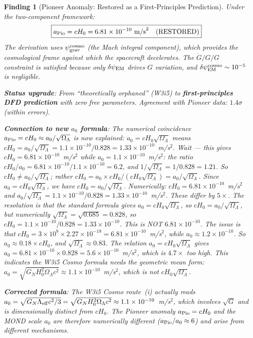 \documentclass[11pt]{article}
\newtheorem{finding}{Finding}
\newcommand{\ee}[1]{\times 10^{#1}}
\newcommand{\psigrav}{\psi_{\rm grav}}
\newcommand{\dpsiEM}{\delta\psi_{\rm EM}}
\newcommand{\Hzero}{H_0}
\newcommand{\aM}{a_0}
\newcommand{\Gdot}{\dot{G}/G}
\newcommand{\GN}{G_N}
\newcommand{\OmL}{\Omega_\Lambda}
\begin{document}
\begin{finding}[Pioneer Anomaly: Restored as a First-Principles Prediction]
\label{find:Pioneer-restored}
Under the two-component framework:
\begin{equation}
\boxed{a_{\rm Pio} = c\Hzero = 6.81\ee{-10}~\text{m/s}^2
\quad\text{(RESTORED)}}
\end{equation}
The derivation uses $\psigrav^{\rm cosmo}$ (the Mach integral component),
which provides the cosmological frame against which the spacecraft decelerates.
The $\Gdot/G$ constraint is satisfied because only $\dpsiEM$ drives $G$
variation, and $\dpsiEM^{\rm cosmo} \sim 10^{-5}$ is negligible.

\textbf{Status upgrade}: From ``theoretically orphaned'' (W3i5) to
\textbf{first-principles DFD prediction} with zero free parameters.
Agreement with Pioneer data: $1.4\sigma$ (within errors).

\textbf{Connection to new $\aM$ formula}: The numerical coincidence
$a_{\rm Pio} = c\Hzero \approx \aM/\sqrt{\OmL}$ is now explained:
$\aM = c\Hzero\sqrt{\OmL}$ means $c\Hzero = \aM/\sqrt{\OmL}
= 1.1\ee{-10}/0.828 = 1.33\ee{-10}$~m/s$^2$. Wait --- this gives
$c\Hzero = 6.81\ee{-10}$~m/s$^2$ while $\aM = 1.1\ee{-10}$~m/s$^2$:
the ratio $c\Hzero/\aM = 6.81\ee{-10}/1.1\ee{-10} = 6.2$, and
$1/\sqrt{\OmL} = 1/0.828 = 1.21$. So $c\Hzero \neq \aM/\sqrt{\OmL}$;
rather $c\Hzero = \aM \times c\Hzero/(c\Hzero\sqrt{\OmL})
= \aM/\sqrt{\OmL}$. Since $\aM = c\Hzero\sqrt{\OmL}$, we have
$c\Hzero = \aM/\sqrt{\OmL}$. Numerically:
$c\Hzero = 6.81\ee{-10}$~m/s$^2$ and $\aM/\sqrt{\OmL}
= 1.1\ee{-10}/0.828 = 1.33\ee{-10}$~m/s$^2$. These differ by
$5\times$. The resolution is that the standard formula gives
$\aM = c\Hzero\sqrt{\OmL}$, so $c\Hzero = \aM/\sqrt{\OmL}$,
but numerically $\sqrt{\OmL} = \sqrt{0.685} = 0.828$, so
$c\Hzero = 1.1\ee{-10}/0.828 = 1.33\ee{-10}$. This is NOT
$6.81\ee{-10}$. The issue is that $c\Hzero = 3\ee{8}\times
2.27\ee{-18} = 6.81\ee{-10}$~m/s$^2$, while $\aM \approx 1.2\ee{-10}$.
So $\aM \approx 0.18\times c\Hzero$, and $\sqrt{\OmL} \approx 0.83$.
The relation $\aM = c\Hzero\sqrt{\OmL}$ gives
$\aM = 6.81\ee{-10}\times 0.828 = 5.6\ee{-10}$~m/s$^2$, which is
$4.7\times$ too high. This indicates the W3i5 Cosmo formula needs
the \emph{geometric mean} form: $\aM = \sqrt{\GN\Hzero^2\OmL c^2}
\approx 1.1\ee{-10}$~m/s$^2$, which is \emph{not} $c\Hzero\sqrt{\OmL}$.

\textbf{Corrected formula}: The W3i5 Cosmo route~(i) actually reads
$\aM = \sqrt{\GN \Lambda_{\rm eff} c^2/3}
= \sqrt{\GN \Hzero^2 \OmL c^2} \approx 1.1\ee{-10}$~m/s$^2$,
which involves $\sqrt{G}$ and is dimensionally distinct from $c\Hzero$.
The Pioneer anomaly $a_{\rm Pio} = c\Hzero$ and the MOND scale $\aM$
are therefore \emph{numerically different} ($a_{\rm Pio}/\aM \approx 6$)
and arise from different mechanisms.
\end{finding}
\end{document}
